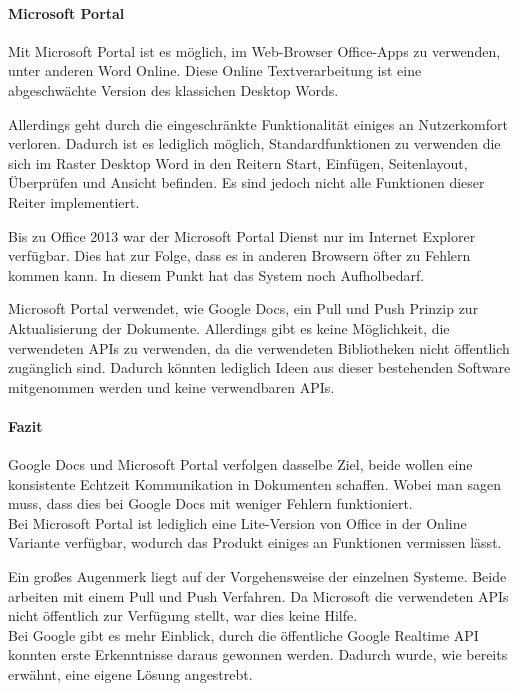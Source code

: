 \newpage

\paragraph{Microsoft Portal}
Mit Microsoft Portal ist es möglich, im Web-Browser Office-Apps zu verwenden, unter anderen Word Online. Diese Online Textverarbeitung ist eine abgeschwächte Version des klassichen Desktop Words.

Allerdings geht durch die eingeschränkte Funktionalität einiges an Nutzerkomfort verloren. Dadurch ist es lediglich möglich, Standardfunktionen zu verwenden die sich im Raster Desktop Word in den Reitern Start, Einfügen, Seitenlayout, Überprüfen und Ansicht befinden. Es sind jedoch nicht alle Funktionen dieser Reiter implementiert.

Bis zu Office 2013 war der Microsoft Portal Dienst nur im Internet Explorer verfügbar. Dies hat zur Folge, dass es in anderen Browsern öfter zu Fehlern kommen kann. In diesem Punkt hat das System noch Aufholbedarf.

Microsoft Portal verwendet, wie Google Docs, ein Pull und Push Prinzip zur Aktualisierung der Dokumente. Allerdings gibt es keine Möglichkeit, die verwendeten APIs zu verwenden, da die verwendeten Bibliotheken nicht öffentlich zugänglich sind. Dadurch könnten lediglich Ideen aus dieser bestehenden Software mitgenommen werden und keine verwendbaren APIs.

\paragraph{Fazit}
Google Docs und Microsoft Portal verfolgen dasselbe Ziel, beide wollen eine konsistente Echtzeit Kommunikation in Dokumenten schaffen. Wobei man sagen muss, dass dies bei Google Docs mit weniger Fehlern funktioniert.\\
Bei Microsoft Portal ist lediglich eine Lite-Version von Office in der Online Variante verfügbar, wodurch das Produkt einiges an Funktionen vermissen lässt.

Ein großes Augenmerk liegt auf der Vorgehensweise der einzelnen Systeme. Beide arbeiten mit einem Pull und Push Verfahren. Da Microsoft die verwendeten APIs nicht öffentlich zur Verfügung stellt, war dies keine Hilfe.\\
Bei Google gibt es mehr Einblick, durch die öffentliche Google Realtime API konnten erste Erkenntnisse daraus gewonnen werden. Dadurch wurde, wie bereits erwähnt, eine eigene Lösung angestrebt.

